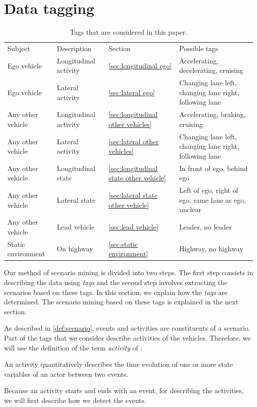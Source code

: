 \section{Data tagging}
\label{sec:tagging}

\begin{table}
	\cstarta
	\centering
	\caption{\cstarta Tags that are considered in this paper.\cenda}
	\label{tab:tags}
	\begin{tabular}{llll}
		\toprule
		Subject & Description & Section & Possible tags \\ \otoprule
		Ego vehicle & Longitudinal activity & \cref{sec:longitudinal ego} & Accelerating, decelerating, cruising \\
		Ego vehicle & Lateral activity & \cref{sec:lateral ego} & Changing lane left, changing lane right, following lane \\
		Any other vehicle & Longitudinal activity & \cref{sec:longitudinal other vehicles} & Accelerating, braking, cruising \\
		Any other vehicle & Lateral activity & \cref{sec:lateral other vehicles} & Changing lane left, changing lane right, following lane \\
		Any other vehicle & Longitudinal state & \cref{sec:longitudinal state other vehicle} & In front of ego, behind ego \\
		Any other vehicle & Lateral state & \cref{sec:lateral state other vehicle} & Left of ego, right of ego, same lane as ego, unclear \\
		Any other vehicle & Lead vehicle & \cref{sec:lead vehicle} & Leader, no leader \\
		Static environment & On highway & \cref{sec:static environment} & Highway, no highway \\ 
		\bottomrule
	\end{tabular}
	\cenda
\end{table}

\cstarta
Our method of scenario mining is divided into two steps. 
The first step consists in describing the data using \emph{tags} and the second step involves extracting the scenarios based on these tags. 
In this section, we explain how the \emph{tags} are determined. 
The scenario mining based on these tags is explained in the next section.

As described in \cref{def:scenario}, events and activities are constituents of a scenario. 
Part of the tags that we consider describe activities of the vehicles.
Therefore, we will use the definition of the term \emph{activity} of \autocite{degelder2018ontology}:\cenda
\begin{definition}[Activity]
	\label{def:activity}
	An activity quantitatively describes the time evolution of one or more state variables of an actor between two events.
\end{definition}
Because an activity starts and ends with an event, for describing the activities, we will first describe how we detect the events.

